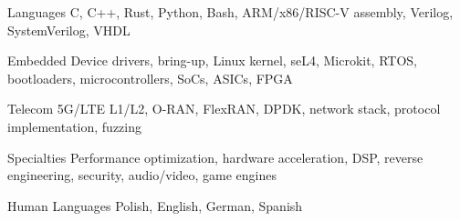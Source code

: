 
\begin{cvskills}

  \cvskill
    {Languages}
    {C, C++, Rust, Python, Bash, ARM/x86/RISC-V assembly, Verilog, SystemVerilog, VHDL}

  \cvskill
    {Embedded}
    {Device drivers, bring-up, Linux kernel, seL4, Microkit, RTOS, bootloaders, microcontrollers, SoCs, ASICs, FPGA}

  \cvskill
    {Telecom}
    {5G/LTE L1/L2, O-RAN, FlexRAN, DPDK, network stack, protocol implementation, fuzzing}

  \cvskill
    {Specialties}
    {Performance optimization, hardware acceleration, DSP, reverse engineering, security, audio/video, game engines}

  \cvskill
    {Human Languages}
    {Polish, English, German, Spanish}

\end{cvskills}
